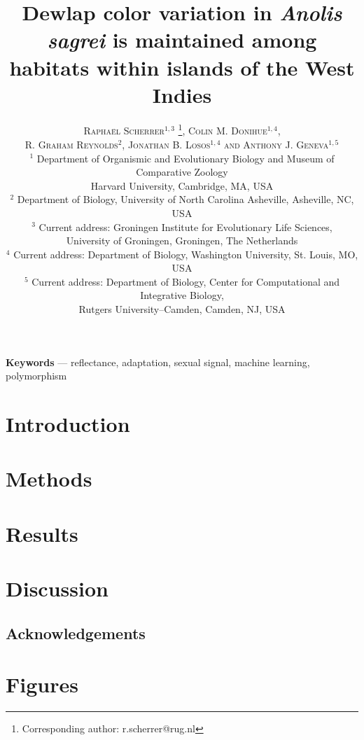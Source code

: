 \documentclass{article}
\title{Dewlap color variation in \textit{Anolis sagrei} is maintained among habitats within islands of the West Indies}
\author{
    \textsc{Rapha\"{e}l Scherrer$^{1,3}$ \thanks{Corresponding author: r.scherrer@rug.nl}, Colin M. Donihue$^{1,4}$, }\\
	\textsc{R. Graham Reynolds$^2$, Jonathan B. Losos$^{1,4}$ and Anthony J. Geneva$^{1,5}$} \\[1ex]
	\normalsize $^1$ Department of Organismic and Evolutionary Biology and Museum of Comparative Zoology \\ \normalsize Harvard University, Cambridge, MA, USA \\
	\normalsize $^2$ Department of Biology, University of North Carolina Asheville, Asheville, NC, USA\\ 
	\normalsize $^3$ Current address: Groningen Institute for Evolutionary Life Sciences,\\
	\normalsize University of Groningen, Groningen, The Netherlands\\
	\normalsize $^4$ Current address: Department of Biology, Washington University, St. Louis, MO, USA\\
	\normalsize $^5$ Current address: Department of Biology, Center for Computational and Integrative Biology,\\ \normalsize Rutgers University--Camden, Camden, NJ, USA
}
\date{} %
\begin{document}
	
\linenumbers
	
\maketitle

\begin{abstract}
    
\end{abstract}

\textbf{Keywords} --- reflectance, adaptation, sexual signal, machine learning, polymorphism

\section*{Introduction}
	


\pagebreak
	
\section*{Methods}



\pagebreak
	
\section*{Results}



\pagebreak

\section*{Discussion}



\pagebreak
	
\subsection*{Acknowledgements}


	
\pagebreak

\section*{Figures}


\end{document}
